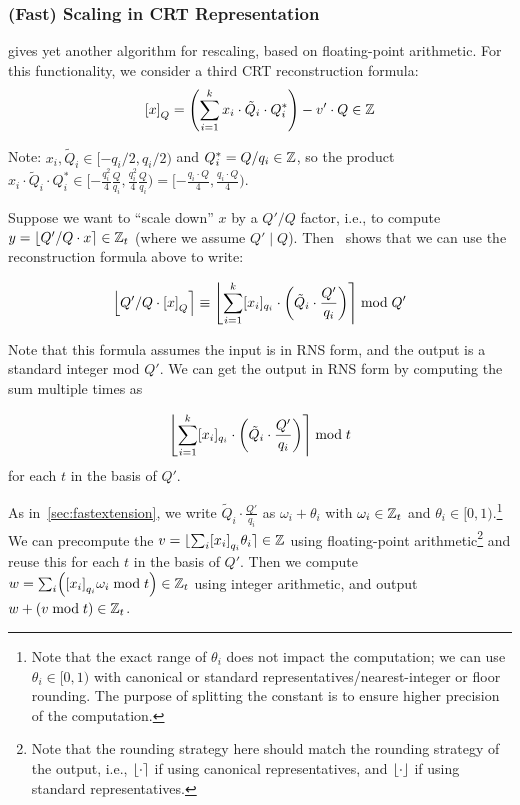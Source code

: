 \documentclass[../keyswitching.tex]{subfiles}
\begin{document}
\subsubsection{(Fast) Scaling in CRT Representation}
\label{sec:fastscaling}
\cite{cryptoeprint:2018/117} gives yet another algorithm for rescaling, based on floating-point arithmetic. 
For this functionality, we consider a third CRT reconstruction formula:
\[\bracks*{x}_Q=\parens*{\sum_{i=1}^k x_i\cdot\tilde{Q}_i\cdot Q_i^*}-v'\cdot Q\in\Z\]

Note: $x_i, \tilde{Q}_i \in [-q_i/2, q_i/2)$ and $Q_i^* = Q/q_i \in \Z$, so the product $x_i\cdot\tilde{Q}_i\cdot Q_i^* \in [-\frac{q_i^2}{4}\frac{Q}{q_i}, \frac{q_i^2}{4}\frac{Q}{q_i})= [-\frac{q_i\cdot Q}{4}, \frac{q_i\cdot Q}{4})$. 

Suppose we want to ``scale down'' $x$ by a $Q'/Q$ factor, i.e., to compute $y=\round{Q'/Q\cdot x}\in\Z_t$ (where we assume $Q' \mid Q$). Then~\cite{cryptoeprint:2018/117} shows that we can use the reconstruction formula above to write: 

\[\round*{Q'/Q\cdot \bracks*{x}_Q} \equiv \round*{\sum_{i=1}^k \bracks{x_i}_{q_i}\cdot\parens*{\tilde{Q}_i\cdot\frac{Q'}{q_i}}} \bmod Q'\]

Note that this formula assumes the input is in RNS form, and the output is a standard integer mod $Q'$. We can get the output in RNS form by computing the sum multiple times as

\[\round*{\sum_{i=1}^k \bracks{x_i}_{q_i}\cdot\parens*{\tilde{Q}_i\cdot\frac{Q'}{q_i}}} \bmod t\]
for each $t$ in the basis of $Q'$.

As in~\cref{sec:fastextension}, we write $\tilde{Q}_i\cdot\frac{Q'}{q_i}$ as $\omega_i+\theta_i$ with $\omega_i\in\Z_t$ and $\theta_i\in[0, 1)$.\footnote{Note that the exact range of $\theta_i$ does not impact the computation; we can use $\theta_i\in[0, 1)$ with canonical or standard representatives/nearest-integer or floor rounding. The purpose of splitting the constant is to ensure higher precision of the computation.} 
We can precompute the $v=\round{\sum_i \bracks*{x_i}_{q_i}\theta_i}\in\Z$ using floating-point arithmetic\footnote{Note that the rounding strategy here should match the rounding strategy of the output, i.e., $\round{\cdot}$ if using canonical representatives, and $\floor{\cdot}$ if using standard representatives.} and reuse this for each $t$ in the basis of $Q'$.
Then we compute $w = \sum_i \parens*{\bracks*{x_i}_{q_i}\omega_i \bmod t}\in\Z_t$ using integer arithmetic, and output $w+(v\bmod t)\in\Z_t$.
\end{document}
